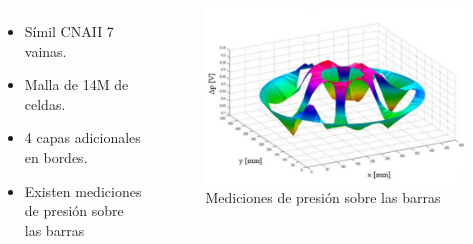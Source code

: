\documentclass[9pt,mathserif]{beamer}
\begin{document}
{\begin{columns}
    \begin{minipage}[c][0.4\textheight][c]{\linewidth}
      \begin{itemize}
      \item Símil CNAII 7 vainas.
      \item Malla de 14M de celdas.
      \item 4 capas adicionales en bordes.
      \item<1- | alert@1> Existen mediciones de presi\'on sobre las barras
      \end{itemize}
    \end{minipage}
    

    \begin{minipage}[c][0.5\textheight][c]{\linewidth}
      \begin{figure}
        \includegraphics[width=0.95\linewidth]{figsATUCHA/Nalin2.png} %
        \caption{Mediciones de presi\'on sobre las barras}
        \end{figure}
    \end{minipage}
  \end{columns}

    
    
}
\end{document}
